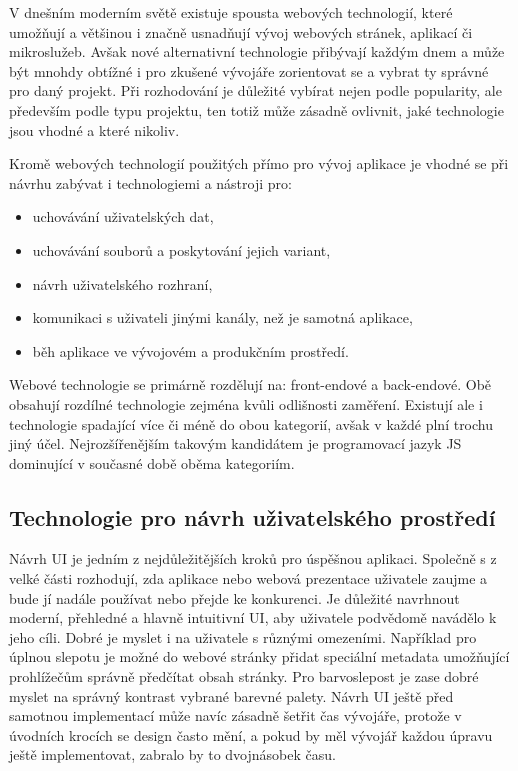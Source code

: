 V dnešním moderním světě existuje spousta webových technologií, které umožňují a většinou i značně usnadňují vývoj
webových stránek, aplikací či mikroslužeb.
Avšak nové alternativní technologie přibývají každým dnem a může být mnohdy obtížné i pro zkušené
vývojáře zorientovat se a vybrat ty správné pro daný projekt.
Při rozhodování je důležité vybírat nejen podle popularity, ale především podle typu projektu, ten totiž může zásadně
ovlivnit, jaké technologie jsou vhodné a které nikoliv.

Kromě webových technologií použitých přímo pro vývoj aplikace je vhodné se při návrhu zabývat i technologiemi a nástroji
pro:
\begin{itemize}
	\item uchovávání uživatelských dat,
	\item uchovávání souborů a poskytování jejich variant,
	\item návrh uživatelského rozhraní,
	\item komunikaci s uživateli jinými kanály, než je samotná aplikace,
	\item běh aplikace ve vývojovém a produkčním prostředí.
\end{itemize}

Webové technologie se primárně rozdělují na: front-endové a back-endové.
Obě obsahují rozdílné technologie zejména kvůli odlišnosti zaměření.
Existují ale i technologie spadající více či méně do obou kategorií, avšak v každé plní trochu jiný účel.
Nejrozšířenějším takovým kandidátem je programovací jazyk \ac{JS} dominující v současné době oběma kategoriím.

	\subsection{Technologie pro návrh uživatelského prostředí}

	Návrh \ac{UI} je jedním z nejdůležitějších kroků pro úspěšnou aplikaci.
	Společně s  z velké části rozhodují, zda aplikace nebo webová prezentace
	uživatele zaujme a bude jí nadále používat nebo přejde ke konkurenci.
	Je důležité navrhnout moderní, přehledné a hlavně intuitivní \ac{UI}, aby uživatele podvědomě navádělo k jeho cíli.
	Dobré je myslet i na uživatele s různými omezeními.
	Například pro úplnou slepotu je možné do webové stránky přidat speciální metadata umožňující prohlížečům správně
	předčítat obsah stránky.
	Pro barvoslepost je zase dobré myslet na správný kontrast vybrané barevné palety.
	Návrh \ac{UI} ještě před samotnou implementací může navíc zásadně šetřit čas vývojáře, protože v úvodních krocích
	se design často mění, a pokud by měl vývojář každou úpravu ještě implementovat, zabralo by to dvojnásobek času.

